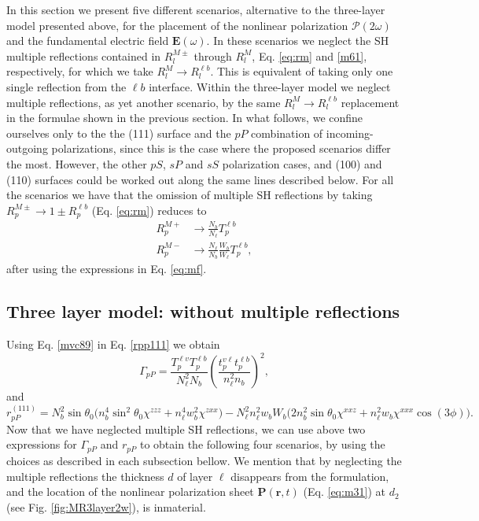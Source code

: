 In this section we present five different scenarios, alternative to the three-layer model presented above, for the placement of the nonlinear polarization $\boldsymbol{\mathcal{P}}(2\omega)$ and the fundamental electric field $\mathbf{E}(\omega)$. In these scenarios we neglect the SH multiple reflections contained in $R^{M\pm}_{l}$ through $R^{M}_{l}$, Eq. \eqref{eq:rm} and \eqref{m61}, respectively, for which we take $R^{M}_{l}\to R^{\ell b}_{l}$. This is equivalent of taking only one single reflection from the $\ell b$ interface. Within the three-layer model we neglect multiple reflections, as yet another scenario, by the same $R^{M}_{l}\to R^{\ell b}_{l}$ replacement in the formulae shown in the previous section. In what follows, we confine ourselves only to the the (111) surface and the $pP$ combination of incoming-outgoing polarizations, since this is the case where the proposed scenarios differ the most. However, the other $pS$, $sP$ and $sS$ polarization cases, and (100) and (110) surfaces could be worked out along the same lines described below. For all the scenarios we have that the omission of multiple SH reflections by taking $R^{M\pm}_{p}\to 1\pm R^{\ell b}_{p}$ (Eq. \eqref{eq:rm}) reduces to
\begin{align}\label{mvc89}
R^{M+}_{p}&\to\frac{N_{b}}{N_{\ell}}T^{\ell b}_{p}\nonumber\\
R^{M-}_{p}&\to\frac{N_{\ell}}{N_{b}}\frac{W_{b}}{W_{\ell}}T^{\ell b}_{p},
\end{align}
after using the expressions in Eq. \eqref{eq:mf}.



\subsection{Three layer model: without multiple reflections}\label{sec:nomr}

Using Eq. \eqref{mvc89} in Eq. \eqref{rpp111} we obtain
\begin{equation}\label{m79}
\Gamma_{pP}=
\frac{T_{p}^{\ell v}T^{\ell b}_{p}}
     {N^{2}_{\ell}N_{b}}
\left(
\frac{t_{p}^{v\ell}t^{\ell b}_{p}}
     {n^{2}_{\ell}n_{b}}
\right)^{2},  
\end{equation}
and
\begin{equation}\label{m81}
r^{(111)}_{pP} =
N^{2}_{b}\sin\theta_{0}
\Big(
  n^{4}_{b}\sin^{2}\theta_{0}\chi^{zzz}
+ n^{4}_{\ell}w^2_{b}\chi^{zxx}
\Big)
- N^{2}_{\ell}n^{2}_{\ell}w_{b}W_{b}
\Big(
  2n^{2}_{b}\sin\theta_{0}\chi^{xxz}
+ n^{2}_{\ell}w_{b}\chi^{xxx}\cos(3\phi) 
\Big).
\end{equation}
Now that we have neglected multiple SH reflections, we can use above two expressions for $\Gamma_{pP}$ and $r_{pP}$ to obtain the following four scenarios, by using the choices as described in each subsection bellow. We mention that by neglecting the multiple reflections the thickness $d$ of layer $\ell$ disappears from the formulation, and the location of the nonlinear polarization sheet $\mathbf{P}(\mathbf{r},t)$ (Eq. \eqref{eq:m31}) at $d_{2}$ (see Fig. \ref{fig:MR3layer2w}), is inmaterial.

